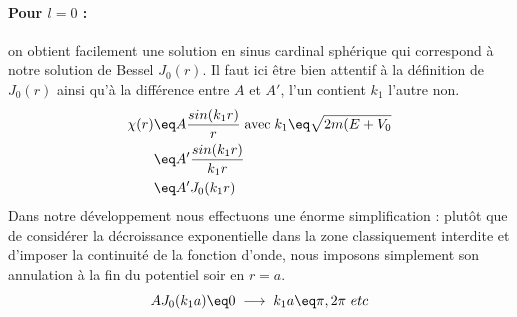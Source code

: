 \paragraph{Pour $l=0$ :} on obtient facilement une solution en sinus cardinal sphérique qui correspond à notre solution de Bessel $J_0(r)$. Il faut ici être bien attentif à la définition de $J_0(r)$ ainsi qu'à la différence entre $A$ et $A'$, l'un contient $k_1$ l'autre non.
\begin{align*}
    \chi(r) &\eq A\frac{sin(k_1r)}{r}\; \text{avec}\; k_1 \eq \sqrt{2m(E+V_0}\\
    &\eq A' \frac{sin(k_1r)}{k_1 r}\\
    &\eq A'J_0(k_1 r)
\end{align*}
Dans notre développement nous effectuons une énorme simplification : plutôt que de considérer la décroissance exponentielle dans la zone classiquement interdite et d'imposer la continuité de la fonction d'onde, nous imposons simplement son annulation à la fin du potentiel soir en $r = a$.
\begin{equation*}
    AJ_0(k_1a) \eq 0 \; \longrightarrow \; k_1 a \eq \pi,2\pi \ etc
\end{equation*}
